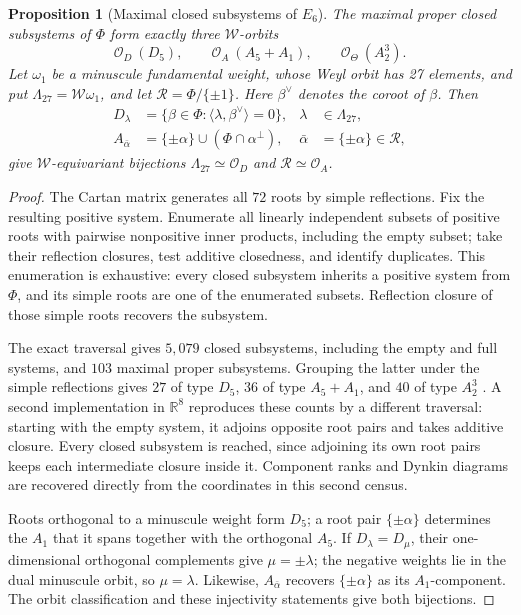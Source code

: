 \documentclass[11pt]{article}
\newtheorem{proposition}[theorem]{Proposition}
\theoremstyle{remark}
\begin{document}
\begin{proposition}[Maximal closed subsystems of \(E_6\)]
\label{prop:e6-subsystems}
The maximal proper closed subsystems of \(\Phi\) form exactly three
\(\mathcal W\)-orbits
\[
 \mathcal O_D\ (D_5),\qquad
 \mathcal O_A\ (A_5+A_1),\qquad
 \mathcal O_\Theta\ (A_2^3).
\]
Let \(\omega_1\) be a minuscule fundamental weight, whose Weyl orbit has
27 elements, and put
\(\Lambda_{27}=\mathcal W\omega_1\), and let
\(\mathcal R=\Phi/\{\pm1\}\). Here \(\beta^\vee\) denotes the coroot
of \(\beta\). Then
\[
\begin{aligned}
 D_\lambda
 &=\{\beta\in\Phi:
       \langle\lambda,\beta^\vee\rangle=0\},
 &\lambda&\in\Lambda_{27},\\
 A_{\bar\alpha}
 &=\{\pm\alpha\}\cup(\Phi\cap\alpha^\perp),
 &\bar\alpha&=\{\pm\alpha\}\in\mathcal R,
\end{aligned}
\]
give \(\mathcal W\)-equivariant bijections
\(\Lambda_{27}\simeq\mathcal O_D\) and
\(\mathcal R\simeq\mathcal O_A\).
\end{proposition}
\begin{proof}
The Cartan matrix generates all \(72\) roots by simple reflections.
Fix the resulting positive system. Enumerate all linearly independent
subsets of positive roots with pairwise nonpositive inner products, including
the empty subset; take their reflection closures, test additive closedness,
and identify duplicates. This enumeration is exhaustive: every closed
subsystem inherits a positive system from \(\Phi\), and its simple roots
are one of the enumerated subsets. Reflection closure of those simple roots
recovers the subsystem.

The exact traversal gives \(5{,}079\) closed subsystems, including the empty
and full systems, and \(103\) maximal proper subsystems. Grouping the latter
under the simple reflections gives \(27\) of type \(D_5\), \(36\) of type
\(A_5+A_1\), and \(40\) of type \(A_2^3\)
\cite{ComputationalCompanion}. A second implementation in \(\mathbb R^8\)
reproduces these counts by a different traversal: starting with the empty
system, it adjoins opposite root pairs and takes additive closure. Every
closed subsystem is reached, since adjoining its own root pairs keeps each
intermediate closure inside it. Component ranks and Dynkin diagrams are
recovered directly from the coordinates in this second census.

Roots orthogonal to a minuscule weight form \(D_5\); a root pair
\(\{\pm\alpha\}\) determines the
\(A_1\) that it spans together with the orthogonal \(A_5\). If
\(D_\lambda=D_\mu\), their
one-dimensional orthogonal complements give \(\mu=\pm\lambda\); the
negative weights lie in the dual minuscule orbit, so \(\mu=\lambda\).
Likewise, \(A_{\bar\alpha}\) recovers \(\{\pm\alpha\}\) as its
\(A_1\)-component. The orbit classification and these injectivity statements give both
bijections.
\end{proof}
\end{document}
